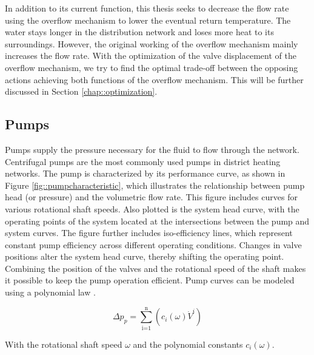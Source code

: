 In addition to its current function, this thesis seeks to decrease the flow rate using the overflow mechanism to lower the eventual return temperature. The water stays longer in the distribution network and loses more heat to its surroundings. However, the original working of the overflow mechanism mainly increases the flow rate. With the optimization of the valve displacement of the overflow mechanism, we try to find the optimal trade-off between the opposing actions achieving both functions of the overflow mechanism. This will be further discussed in Section \ref{chap::optimization}.

\subsection{Pumps}
Pumps supply the pressure necessary for the fluid to flow through the network. Centrifugal pumps are the most commonly used pumps in district heating networks. The pump is characterized by its performance curve, as shown in Figure \ref{fig::pumpcharacteristic}, which illustrates the relationship between pump head (or pressure) and the volumetric flow rate. This figure includes curves for various rotational shaft speeds. Also plotted is the system head curve, with the operating points of the system located at the intersections between the pump and system curves. The figure further includes iso-efficiency lines, which represent constant pump efficiency across different operating conditions. Changes in valve positions alter the system head curve, thereby shifting the operating point. Combining the position of the valves and the rotational speed of the shaft makes it possible to keep the pump operation efficient. Pump curves can be modeled using a polynomial law \cite{echtephdthesis}. 

\begin{equation}\label{eq::pumpchar}
    \Delta p_{p} = \sum^{\text{n}}_{\text{i=1}} \left( c_i(\omega)  \dot{V}^{i} \right)
\end{equation}

With the rotational shaft speed $\omega$ and the polynomial constants $c_i(\omega)$. 

